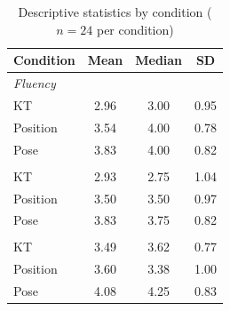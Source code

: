 \begin{table}[htbp]
\centering
\caption{Descriptive statistics by condition ($n = 24$ per condition)}
\label{tab:descriptive-stats-by-condition}
\begin{tabular}{lccc}
\toprule
Condition & Mean & Median & SD \\
\midrule
\multicolumn{4}{l}{\textit{Fluency}} \\
KT       & 2.96 & 3.00 & 0.95 \\
Position & 3.54 & 4.00 & 0.78 \\
Pose     & 3.83 & 4.00 & 0.82 \\
\addlinespace
\multicolumn{4}{l}{\textit{Adapts}} \\
KT       & 2.93 & 2.75 & 1.04 \\
Position & 3.50 & 3.50 & 0.97 \\
Pose     & 3.83 & 3.75 & 0.82 \\
\addlinespace
\multicolumn{4}{l}{\textit{Helpfulness}} \\
KT       & 3.49 & 3.62 & 0.77 \\
Position & 3.60 & 3.38 & 1.00 \\
Pose     & 4.08 & 4.25 & 0.83 \\
\bottomrule
\end{tabular}
\end{table}
